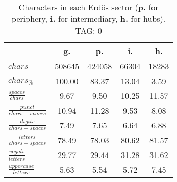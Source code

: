 \begin{table}[h!]
\begin{center}
\begin{tabular}{| l | c | c | c | c |}\hline
 & g. & p. & i. & h. \\\hline
$chars$ & 508645  & 424058  & 66304  & 18283 \\\hline
$chars_{\%}$ & 100.00  & 83.37  & 13.04  & 3.59 \\\hline
$\frac{spaces}{chars}$ & 9.67  & 9.50  & 10.25  & 11.57 \\\hline
$\frac{punct}{chars-spaces}$ & 10.94  & 11.28  & 9.53  & 8.08 \\\hline
$\frac{digits}{chars-spaces}$ & 7.49  & 7.65  & 6.64  & 6.88 \\\hline
$\frac{letters}{chars-spaces}$ & 78.49  & 78.03  & 80.62  & 81.57 \\\hline
$\frac{vogals}{letters}$ & 29.77  & 29.44  & 31.28  & 31.62 \\\hline
$\frac{uppercase}{letters}$ & 5.63  & 5.54  & 5.72  & 7.45 \\\hline
\end{tabular}
\caption{Characters in each Erd\"os sector ({{\bf p.}} for periphery, {{\bf i.}} for intermediary, 
    {{\bf h.}} for hubs). TAG: 0}
\end{center}
\end{table}